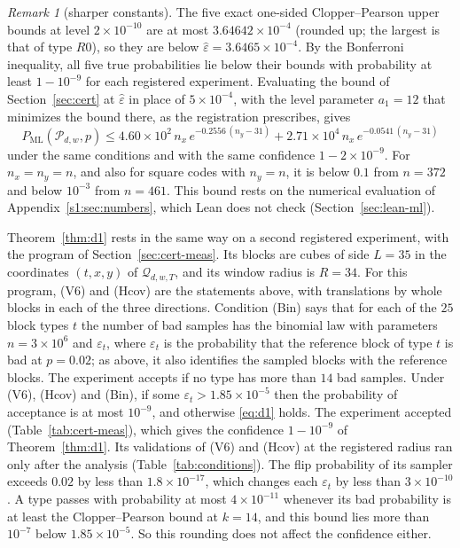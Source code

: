 \documentclass[11pt]{amsart}
\theoremstyle{definition}
\theoremstyle{remark}
\newtheorem{remark}[theorem]{Remark}
\numberwithin{equation}{section}
\newcommand{\PML}{P_{\mathrm{ML}}}
\begin{document}
\begin{remark}[sharper constants]\label{rem:sharper}
The five exact one-sided Clopper--Pearson upper bounds at level $2\times10^{-10}$ are at most $3.64642\times10^{-4}$ (rounded up; the largest is that of type $R0$), so they are below $\hat\varepsilon=3.6465\times10^{-4}$. By the Bonferroni inequality, all five true probabilities lie below their bounds with probability at least $1-10^{-9}$ for each registered experiment. Evaluating the bound of Section~\ref{sec:cert} at $\hat\varepsilon$ in place of $5\times10^{-4}$, with the level parameter $a_1=12$ that minimizes the bound there, as the registration prescribes, gives
\[
\PML(\mathcal P_{d,w},p)\le 4.60\times10^{2}\,n_x\,e^{-0.2556\,(n_y-31)}+2.71\times10^{4}\,n_x\,e^{-0.0541\,(n_y-31)}
\]
under the same conditions and with the same confidence $1-2\times10^{-9}$. For $n_x=n_y=n$, and also for square codes with $n_y=n$, it is below $0.1$ from $n=372$ and below $10^{-3}$ from $n=461$. This bound rests on the numerical evaluation of Appendix~\ref{s1:sec:numbers}, which Lean does not check (Section~\ref{sec:lean-ml}).
\end{remark}

Theorem~\ref{thm:d1} rests in the same way on a second registered experiment, with the program of Section~\ref{sec:cert-meas}. Its blocks are cubes of side $L=35$ in the coordinates $(t,x,y)$ of $\mathcal Q_{d,w,T}$, and its window radius is $R=34$. For this program, (V6) and (Hcov) are the statements above, with translations by whole blocks in each of the three directions. Condition (Bin) says that for each of the $25$ block types $t$ the number of bad samples has the binomial law with parameters $n=3\times10^{6}$ and $\varepsilon_t$, where $\varepsilon_t$ is the probability that the reference block of type $t$ is bad at $p=0.02$; as above, it also identifies the sampled blocks with the reference blocks. The experiment accepts if no type has more than $14$ bad samples. Under (V6), (Hcov) and (Bin), if some $\varepsilon_t>1.85\times10^{-5}$ then the probability of acceptance is at most $10^{-9}$, and otherwise \eqref{eq:d1} holds. The experiment accepted (Table~\ref{tab:cert-meas}), which gives the confidence $1-10^{-9}$ of Theorem~\ref{thm:d1}. Its validations of (V6) and (Hcov) at the registered radius ran only after the analysis (Table~\ref{tab:conditions}). The flip probability of its sampler exceeds $0.02$ by less than $1.8\times10^{-17}$, which changes each $\varepsilon_t$ by less than $3\times10^{-10}$. A type passes with probability at most $4\times10^{-11}$ whenever its bad probability is at least the Clopper--Pearson bound at $k=14$, and this bound lies more than $10^{-7}$ below $1.85\times10^{-5}$. So this rounding does not affect the confidence either.
\end{document}
